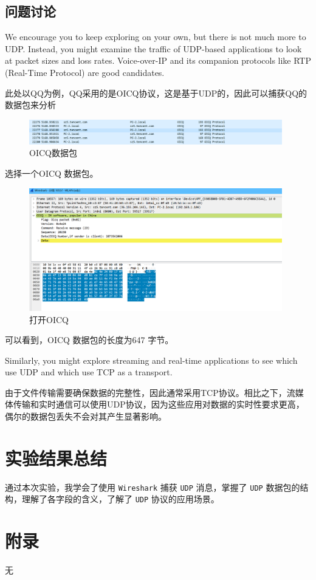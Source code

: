 \documentclass{article}
\begin{document}
	\subsection{问题讨论}
	
	We encourage you to keep exploring on your own, but there is not much more to UDP. Instead, you might examine the traffic of UDP-based applications to look at packet sizes and loss rates. Voice-over-IP and its companion protocols like RTP (Real-Time Protocol) are good candidates. 
	
	此处以QQ为例，QQ采用的是OICQ协议，这是基于UDP的，因此可以捕获QQ的数据包来分析

	\begin{figure}[H]
		\centering
		\includegraphics[width=11cm]{images/13.OICQ数据包.png}
		\caption{OICQ数据包}
	\end{figure}
	
	选择一个OICQ 数据包。
	
	\begin{figure}[H]
		\centering
		\includegraphics[width=11cm]{images/14.打开OICQ.png}
		\caption{打开OICQ}
	\end{figure}
	
	可以看到，OICQ 数据包的长度为647 字节。
	
	Similarly, you might explore streaming and real-time applications to see which use UDP and which use TCP as a transport.
	
	由于文件传输需要确保数据的完整性，因此通常采用TCP协议。相比之下，流媒体传输和实时通信可以使用UDP协议，因为这些应用对数据的实时性要求更高，偶尔的数据包丢失不会对其产生显著影响。
	
	\section{实验结果总结}
	
	通过本次实验，我学会了使用 \texttt{Wireshark} 捕获 \texttt{UDP} 消息，掌握了 \texttt{UDP} 数据包的结构，理解了各字段的含义，了解了 \texttt{UDP} 协议的应用场景。
	
	\section{附录}
	
	无
\end{document}
